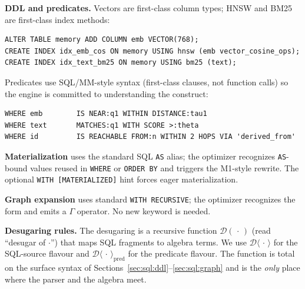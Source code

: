 \documentclass[sigconf]{acmart}
\theoremstyle{plain}
\theoremstyle{definition}
\theoremstyle{remark}
\begin{document}
\textbf{DDL and predicates.}\label{sec:sql:ddl} Vectors are first-class column
types; HNSW and BM25 are first-class index methods:

\begin{lstlisting}
ALTER TABLE memory ADD COLUMN emb VECTOR(768);
CREATE INDEX idx_emb_cos ON memory USING hnsw (emb vector_cosine_ops);
CREATE INDEX idx_text_bm25 ON memory USING bm25 (text);
\end{lstlisting}

Predicates use SQL/MM-style syntax (first-class clauses, not
function calls) so the engine is committed to understanding the
construct:

\begin{lstlisting}
WHERE emb        IS NEAR:q1 WITHIN DISTANCE:tau1
WHERE text       MATCHES:q1 WITH SCORE >:theta
WHERE id         IS REACHABLE FROM:n WITHIN 2 HOPS VIA 'derived_from'
\end{lstlisting}

\textbf{Materialization} uses the standard SQL \texttt{AS} alias;
the optimizer recognizes \texttt{AS}-bound values reused in
\texttt{WHERE} or \texttt{ORDER BY} and triggers the M1-style
rewrite. The optional \texttt{WITH [MATERIALIZED]} hint forces
eager materialization.

\textbf{Graph expansion}\label{sec:sql:graph} uses standard \texttt{WITH RECURSIVE};
the optimizer recognizes the form and emits a $\Gamma$ operator.
No new keyword is needed.

\textbf{Desugaring rules.} The desugaring is a recursive
function $\mathcal{D}(\,\cdot\,)$ (read ``desugar of $\cdot$'')
that maps SQL fragments to algebra terms. We use
$\mathcal{D}\!\langle\,\cdot\,\rangle$ for the SQL-source
flavour and $\mathcal{D}\!\langle\,\cdot\,\rangle_{\mathrm{pred}}$
for the predicate flavour. The function is total on the surface
syntax of Sections~\ref{sec:sql:ddl}--\ref{sec:sql:graph} and is
the \emph{only} place where the parser and the algebra meet.
\end{document}
